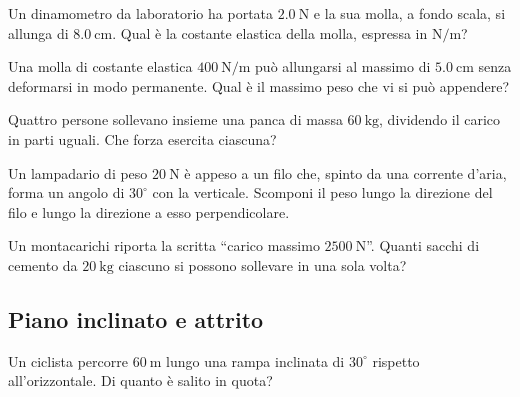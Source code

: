 \begin{esercizio}
Un dinamometro da laboratorio ha portata $\SI{2,0}{\newton}$ e la sua molla, a fondo scala, si allunga di $\SI{8,0}{\centi\meter}$. Qual è la costante elastica della molla, espressa in $\si{\newton\per\meter}$?\\
\end{esercizio}

\begin{esercizio}
Una molla di costante elastica $\SI{400}{\newton\per\meter}$ può allungarsi al massimo di $\SI{5,0}{\centi\meter}$ senza deformarsi in modo permanente. Qual è il massimo peso che vi si può appendere?\\
\end{esercizio}

\begin{esercizio}
Quattro persone sollevano insieme una panca di massa $\SI{60}{\kilo\gram}$, dividendo il carico in parti uguali. Che forza esercita ciascuna?\\
\end{esercizio}

\begin{esercizio}
Un lampadario di peso $\SI{20}{\newton}$ è appeso a un filo che, spinto da una corrente d'aria, forma un angolo di $30^\circ$ con la verticale. Scomponi il peso lungo la direzione del filo e lungo la direzione a esso perpendicolare.\\
\end{esercizio}

\begin{esercizio}
Un montacarichi riporta la scritta ``carico massimo $\SI{2500}{\newton}$''. Quanti sacchi di cemento da $\SI{20}{\kilo\gram}$ ciascuno si possono sollevare in una sola volta?\\
\end{esercizio}

\subsection*{Piano inclinato e attrito}

\begin{esercizio}
Un ciclista percorre $\SI{60}{\meter}$ lungo una rampa inclinata di $30^\circ$ rispetto all'orizzontale. Di quanto è salito in quota?\\
\end{esercizio}


